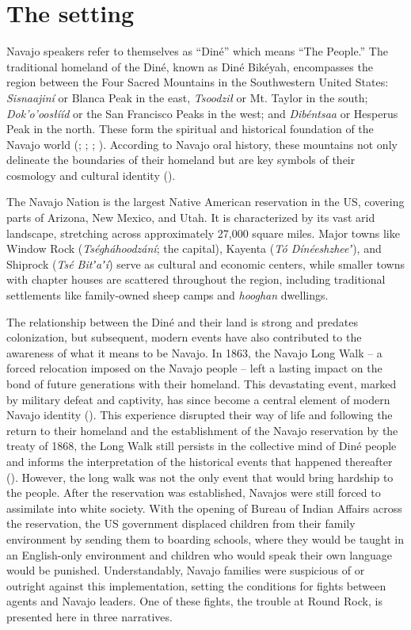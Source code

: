 \section{The setting}

Navajo speakers refer to themselves as ``Diné'' which means ``The People.'' The traditional homeland of the Diné, known as Diné Bikéyah, encompasses the region between the Four Sacred Mountains in the Southwestern United States: \textit{Sisnaajiní} or Blanca Peak in the east, \textit{Tsoodził} or Mt. Taylor in the south; \textit{Dok’o’oosłííd} or the San Francisco Peaks in the west; and \textit{Dibéntsaa} or Hesperus Peak in the north.  These form the spiritual and historical foundation of the Navajo world (\cite{Iverson:2002it}; \cite{Blake:2001oe}; \cite{Linford:2000hb}; \cite{Griffin-Pierce:1997aq}). According to Navajo oral history, these mountains not only delineate the boundaries of their homeland but are key symbols of their cosmology and cultural identity (\cite{Blake:2001oe}).

The Navajo Nation is the largest Native American reservation in the US, covering parts of Arizona, New Mexico, and Utah. It is characterized by its vast arid landscape, stretching across approximately 27,000 square miles. Major towns like Window Rock (\textit{Tségháhoodzání}; the capital), Kayenta (\textit{Tó Dínéeshzheeʼ}), and Shiprock (\textit{Tsé Bitʼaʼí}) serve as cultural and economic centers, while smaller towns with chapter houses are scattered throughout the region, including traditional settlements like family-owned sheep camps and \textit{hooghan} dwellings.

The relationship between the Diné and their land is strong and predates colonization, but subsequent, modern events have also contributed to the awareness of what it means to be Navajo. In 1863, the Navajo Long Walk -- a forced relocation imposed on the Navajo people -- left a lasting impact on the bond of future generations with their homeland. This devastating event, marked by military defeat and captivity, has since become a central element of modern Navajo identity (\cite{Csordas:2000ft}). This experience disrupted their way of life and following the return to their homeland and the establishment of the Navajo reservation by the treaty of 1868, the Long Walk still persists in the collective mind of Diné people and informs the interpretation of the historical events that happened thereafter (\cite{Csordas:2000ft}). However, the long walk was not the only event that would bring hardship to the people. After the reservation was established, Navajos were still forced to assimilate into white society. With the opening of Bureau of Indian Affairs across the reservation, the US government displaced children from their family environment by sending them to boarding schools, where they would be taught in an English-only environment and children who would speak their own language would be punished. Understandably, Navajo families were suspicious of or outright against this implementation, setting the conditions for fights between agents and Navajo leaders. One of these fights, the trouble at Round Rock, is presented here in three narratives.

